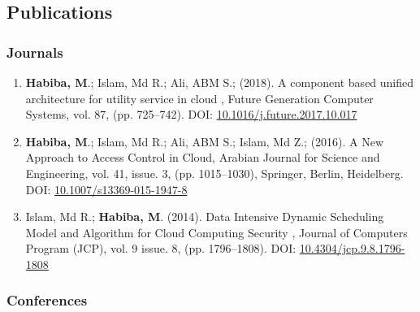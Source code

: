 \documentclass[12pt,]{scrartcl}
\begin{document}
\subsection{Publications}\label{publications}

\subsubsection{Journals}\label{journals}

\begin{enumerate}
  \leftskip-0.13in %
  \item \textbf{Habiba, M}.; Islam, Md R.; Ali, ABM S.; (2018). A component based unified architecture for utility service in cloud , Future Generation Computer Systems, vol. 87, (pp. 725--742). DOI: \href{https://doi.org/10.1016/j.future.2017.10.017}{10.1016/j.future.2017.10.017}
  \item \textbf{Habiba, M}.;  Islam, Md R.;  Ali, ABM S.; Islam, Md Z.; (2016). A New Approach to Access Control in Cloud,  Arabian Journal for Science and Engineering, vol. 41, issue. 3, (pp. 1015--1030), Springer, Berlin, Heidelberg. DOI: \href{https://doi.org/10.1007/s13369-015-1947-8}{10.1007/s13369-015-1947-8}
  
   \item Islam, Md R.;  \textbf{Habiba, M}. (2014). Data Intensive Dynamic Scheduling Model and Algorithm for Cloud Computing Security , Journal of Computers Program (JCP), vol. 9 issue. 8, (pp. 1796--1808). DOI: \href{https://doi.org/10.4304/jcp.9.8.1796-1808 }{10.4304/jcp.9.8.1796-1808 }
\end{enumerate}

\subsubsection{Conferences}\label{conferences}
\end{document}
